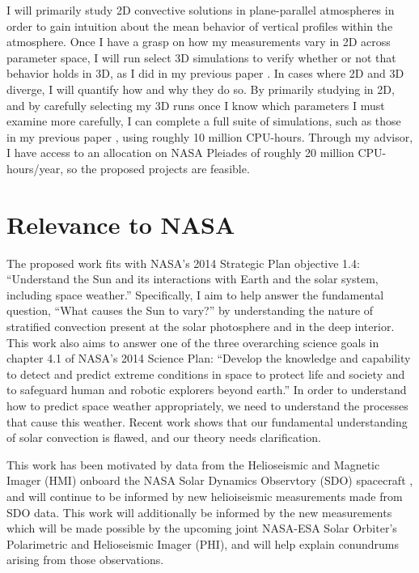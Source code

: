\documentclass[aasms,12pt]{article}
\begin{document}
I will primarily study 2D convective solutions in plane-parallel atmospheres in order to gain
intuition about the mean behavior of vertical profiles within the atmosphere.  Once I have a grasp
on how my measurements vary in 2D across parameter space, I will run select 3D simulations to
verify whether or not that behavior holds in 3D, as I did in my previous paper \citep{anders&brown2017}.
In cases where 2D and 3D diverge, I will quantify how and why they do so.
By primarily studying in 2D, and by carefully
selecting my 3D runs once I know which parameters I must examine more carefully, I can complete
a full suite of simulations, such as those in my previous paper \citep{anders&brown2017}, using
roughly 10 million CPU-hours.  Through my advisor, I have access to an allocation on NASA Pleiades
of roughly 20 million CPU-hours/year, so the proposed projects are feasible.




\section{Relevance to NASA} 
The proposed work fits with NASA's 2014 Strategic Plan objective
1.4:
``Understand the Sun and its interactions with Earth and the solar
system, including space weather.''  Specifically, I aim to help answer
the fundamental question, ``What causes the Sun to vary?'' by understanding
the nature of stratified convection present at the solar photosphere and in the deep interior.
This work also aims to answer one of the three overarching science goals
in chapter 4.1 of NASA's 2014 Science Plan: 
``Develop the
knowledge and capability to detect and predict extreme conditions in space to
protect life and society and to safeguard human and robotic explorers beyond
earth.'' In order to understand how to predict space weather appropriately, we
need to understand the processes that cause this weather.  Recent work
shows that our fundamental understanding of solar convection is flawed, and our theory needs
clarification.

This work has been motivated by data from the Helioseismic and Magnetic Imager (HMI) onboard
the NASA Solar Dynamics Observtory (SDO) spacecraft 
\citep{hanasoge&all2012, greer&all2015, hathaway&all2015}, and will continue to be informed by
new helioiseismic measurements made from SDO data. This work will additionally be informed
by the new measurements which will
be made possible by the upcoming joint NASA-ESA Solar Orbiter's Polarimetric and 
Helioseismic Imager (PHI), and will help explain conundrums arising from those observations.
\end{document}
